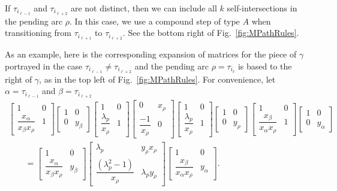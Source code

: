 \documentclass[pdftex]{sigma}%
\numberwithin{equation}{section}
\begin{document}
If $\tau_{i_{\ell-1}}$ and $\tau_{i_{\ell+2}}$ are not distinct, then we can include all $k$ self-intersections in the pending arc $\rho$. In this case, we use a compound step of type $A$ when transitioning from $\tau_{i_{\ell+1}}$ to $\tau_{i_{\ell+2}}$. See the bottom right of Fig.~\ref{fig:MPathRules}.

\begin{Example} As an example, here is the corresponding expansion of matrices for the piece of $\gamma$ portrayed in the case $\tau_{i_{\ell-1}} \neq \tau_{i_{\ell+2}}$ and the pending arc $\rho = \tau_{i_\ell}$ is based to the right of $\gamma$, as in the top left of Fig.~\ref{fig:MPathRules}. For convenience, let $\alpha = \tau_{i_{\ell-1}}$ and $\beta = \tau_{i_{\ell + 2}}$
 \begin{gather*}
 \begin{bmatrix} 1 & 0 \\ \dfrac{x_\alpha}{x_\beta x_\rho} & 1 \end{bmatrix}
 \begin{bmatrix} 1 & 0 \\ 0 & y_{\beta} \end{bmatrix} \begin{bmatrix} 1 & 0 \\ \dfrac{\lambda_p}{x_\rho} & 1 \end{bmatrix}
\begin{bmatrix} 0 & x_\rho \\ \dfrac{-1}{x_\rho} & 0 \end{bmatrix}
 \begin{bmatrix} 1 & 0 \\ \dfrac{\lambda_p}{x_\rho} & 1 \end{bmatrix}
 \begin{bmatrix} 1 & 0 \\ 0 & y_{\rho} \end{bmatrix}
 \begin{bmatrix} 1 & 0 \\ \dfrac{x_\beta}{x_\alpha x_\rho} & 1 \end{bmatrix}
 \begin{bmatrix} 1 & 0 \\ 0 & y_{\alpha} \end{bmatrix}
\\
\qquad{}
= \begin{bmatrix} 1 & 0 \\ \dfrac{x_\alpha}{x_\beta x_\rho} & y_\beta \end{bmatrix}
\begin{bmatrix} \lambda_p & y_{\rho} x_{\rho} \\ \dfrac{(\lambda_p^2 - 1)}{x_{\rho}} & \lambda_p y_{\rho}\end{bmatrix}
 \begin{bmatrix} 1 & 0 \\ \dfrac{x_\beta}{x_\alpha x_\rho} & y_\alpha \end{bmatrix}.
\end{gather*}


\end{Example}
\end{document}
